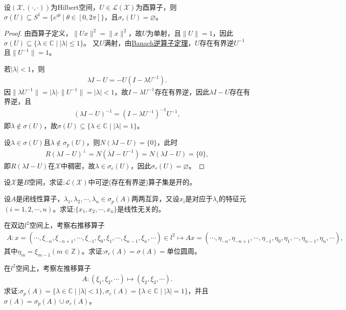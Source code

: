 \documentclass[../../main.tex]{subfiles}%
\begin{document}
\begin{proposition}
设$(\mathscr{X},(\cdot,\cdot))$为Hilbert空间，$U\in\mathscr{L}(\mathscr{X})$为酉算子，则$\sigma(U)\subseteq S^1=\{e^{i\theta}\mid\theta\in[0,2\pi]\}$，且$\sigma_r(U)=\varnothing $。
\end{proposition}
\begin{proof}

由酉算子定义，$\|Ux\|^2=\|x\|^2$，故$U$为单射，且$\|U\|=1$，因此$\sigma(U)\subseteq\{\lambda\in\mathbb{C}\mid|\lambda|\leqslant1\}$。
又$U$满射，由\hyperref[theorem:泛函分析--Banach逆算子定理]{Banach逆算子定理}，$U$存在有界逆$U^{-1}$且$\|U^{-1}\|=1$。

若$|\lambda|<1$，则
\begin{align}
\lambda I-U=-U(I-\lambda U^{-1}).
\label{eq:unitary-decomp}
\end{align}
因$\|\lambda U^{-1}\|=|\lambda|\cdot\|U^{-1}\|=|\lambda|<1$，故$I-\lambda U^{-1}$存在有界逆，因此$\lambda I-U$存在有界逆，且
\begin{align*}
(\lambda I-U)^{-1}=(I-\lambda U^{-1})^{-1}U^{-1},
\end{align*}
即$\lambda\notin\sigma(U)$，故$\sigma(U)\subseteq\{\lambda\in\mathbb{C}\mid|\lambda|=1\}$。

设$\lambda\in\sigma(U)$且$\lambda\notin\sigma_p(U)$，则$N(\lambda I-U)=\{0\}$，此时
\begin{align*}
R(\lambda I-U)^{\perp}=N(\overline{\lambda}I-U^{-1})=N(\lambda I-U)=\{0\},
\end{align*}
即$R(\lambda I-U)$在$\mathscr{X}$中稠密，故$\lambda\in\sigma_c(U)$，因此$\sigma_r(U)=\varnothing $。

\end{proof}



\begin{example}
设$\mathscr{X}$是$B$空间，求证:$\mathscr{L}(\mathscr{X})$中可逆(存在有界逆)算子集是开的。
\end{example}

\begin{example}
设$A$是闭线性算子，$\lambda_1,\lambda_2,\cdots,\lambda_n\in\sigma_p(A)$两两互异，又设$x_i$是对应于$\lambda_i$的特征元$(i=1,2,\cdots,n)$。求证:$\{x_1,x_2,\cdots,x_n\}$是线性无关的。
\end{example}

\begin{example}
在双边$l^2$空间上，考察右推移算子
\begin{align*}
A:x=(\cdots,\xi_{-n},\xi_{-n+1},\cdots,\xi_{-1},\xi_0,\xi_1,\cdots,\xi_{n-1},\xi_n,\cdots)\in l^2
\mapsto Ax=(\cdots,\eta_{-n},\eta_{-n+1},\cdots,\eta_{-1},\eta_0,\eta_1,\cdots,\eta_{n-1},\eta_n,\cdots),
\end{align*}
其中$\eta_m=\xi_{m-1}(m\in\mathbb{Z})$。求证:$\sigma_c(A)=\sigma(A)=$单位圆周。
\end{example}

\begin{example}
在$l^2$空间上，考察左推移算子
\begin{align*}
A:(\xi_1,\xi_2,\cdots)\mapsto(\xi_2,\xi_3,\cdots).
\end{align*}
求证:$\sigma_p(A)=\{\lambda\in\mathbb{C}\mid|\lambda|<1\},\sigma_c(A)=\{\lambda\in\mathbb{C}\mid|\lambda|=1\}$，并且$\sigma(A)=\sigma_p(A)\cup\sigma_c(A)$。
\end{example}
\end{document}
